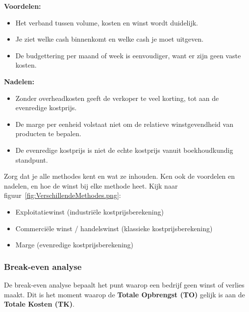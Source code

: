 \documentclass[a4paper,11pt]{article}
\begin{document}
\begin{description}
          \textbf{Voordelen:}
          \begin{itemize}
              \item Het verband tussen volume, kosten en winst wordt duidelijk.
              \item Je ziet welke cash binnenkomt en welke cash je moet uitgeven.
              \item De budgettering per maand of week is eenvoudiger, want er zijn geen vaste kosten.
          \end{itemize}

          \textbf{Nadelen:}
          \begin{itemize}
              \item Zonder overheadkosten geeft de verkoper te veel korting, tot aan de evenredige kostprijs.
              \item De marge per eenheid volstaat niet om de relatieve winstgevendheid van producten te bepalen.
              \item De evenredige kostprijs is niet de echte kostprijs vanuit boekhoudkundig standpunt.
          \end{itemize}
\end{description}

\begin{examenbox}
    Zorg dat je alle methodes kent en wat ze inhouden.
    Ken ook de voordelen en nadelen, en hoe de winst bij elke methode heet.
    Kijk naar figuur~\ref{fig:VerschillendeMethodes.png}:
    \begin{itemize}
        \item Exploitatiewinst (industriële kostprijsberekening)
        \item Commerciële winst / handelswinst (klassieke kostprijsberekening)
        \item Marge (evenredige kostprijsberekening)
    \end{itemize}
\end{examenbox}

\subsubsection{Break-even analyse}
          De break-even analyse bepaalt het punt waarop een bedrijf geen winst of verlies maakt. Dit is het moment waarop de \textbf{Totale Opbrengst (TO)} gelijk is aan de \textbf{Totale Kosten (TK)}.
\end{document}
